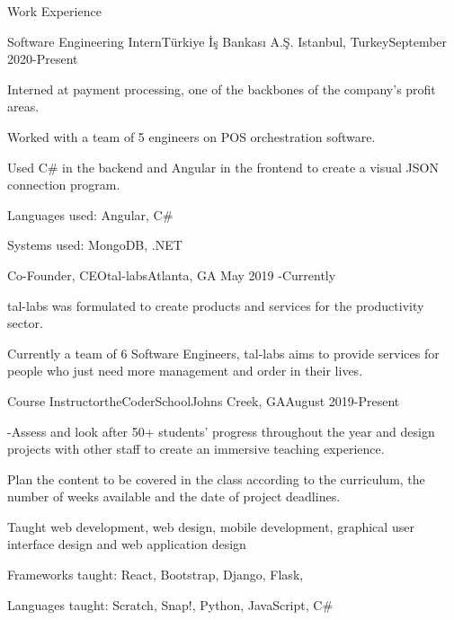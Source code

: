\documentclass{article}
\newlength{\tabin}
\newlength{\secsep}
\newcommand{\lineunder}{\vspace*{-8pt} \\ \hspace*{-6pt} \hrulefill \\ \vspace*{-15pt}}
\newenvironment{tabbedsection}[1]{
  \begin{list}{}{
      \setlength{\itemsep}{0pt}
      \setlength{\labelsep}{0pt}
      \setlength{\labelwidth}{0pt}
      \setlength{\leftmargin}{\tabin}
      \setlength{\rightmargin}{\tabin}
      \setlength{\listparindent}{0pt}
      \setlength{\parsep}{0pt}
      \setlength{\parskip}{0pt}
      \setlength{\partopsep}{0pt}
      \setlength{\topsep}{#1}
    }
  \item[]
}{\end{list}}
\newenvironment{resume_section}[1]{
  \filbreak
  \vspace{2\secsep}
  \textsc{\large#1}
  \lineunder
  \begin{tabbedsection}{\secsep}
}{\end{tabbedsection}}
\newenvironment{subitems}{
  \renewcommand{\labelitemi}{-}
  \begin{itemize}
      \setlength{\labelsep}{1em}
}{\end{itemize}}
\newenvironment{resume_employer}[4]{
  \vspace{\secsep}
  \textbf{#1} \\ 
  \indent {\small #2} \hfill {\footnotesize#3 (#4)}
  \begin{tabbedsection}{0pt}
  \begin{subitems}
}{\end{subitems}\end{tabbedsection}}
\begin{document}
\begin{resume_section}{Work Experience}

\begin{resume_employer}{Software Engineering Intern}{Türkiye İş Bankası A.Ş.
}{Istanbul, Turkey}{September 2020-Present}
 \item Interned at payment processing, one of the backbones of the company's profit areas. 
 \item Worked with a team of 5 engineers on POS orchestration software.
 \item Used C# in the backend and Angular in the frontend to create a visual JSON connection program.
\item Languages used: Angular, C\#
\item Systems used: MongoDB, .NET
    \end{resume_employer}
      \begin{resume_employer}{Co-Founder, CEO}{tal-labs}{Atlanta, GA }{May 2019 -Currently}
    
    \item tal-labs was formulated to create products and services for the productivity sector.
\item Currently a team of 6 Software Engineers, tal-labs aims to provide services for people who just need more management and order in their lives.

  \end{resume_employer}
    
 \begin{resume_employer}{Course Instructor}{theCoderSchool}{Johns Creek, GA}{August 2019-Present}
  \item  -Assess and look after 50+ students' progress throughout the year and design projects with other staff to create an immersive teaching experience.

  \item Plan the content to be covered in the class according to the curriculum, the number of weeks available and the date of project deadlines.
  \item Taught web development, web design, mobile development, graphical user interface design and web application design

  \item Frameworks taught: React, Bootstrap, Django, Flask,
  \item Languages taught: Scratch, Snap!, Python, JavaScript, C#
    \end{resume_employer}
    

\end{resume_section}
\end{document}
